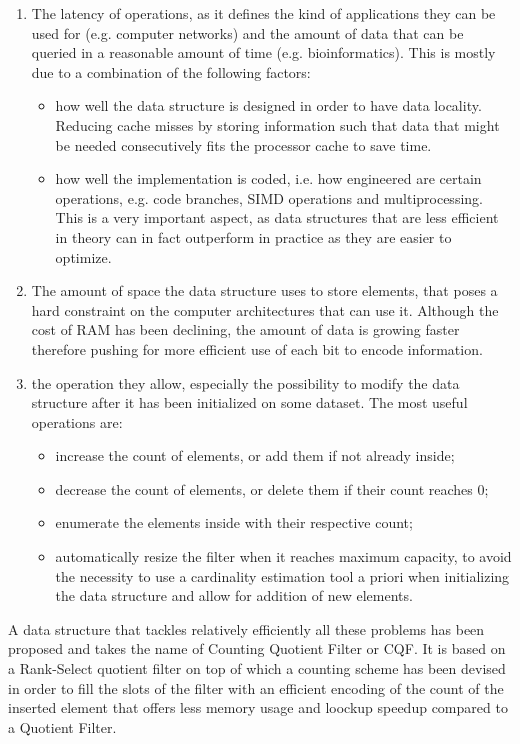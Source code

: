 \begin{enumerate}
	\item The latency of \memb operations, as it defines the kind of applications they can be used for (e.g. computer networks) and the amount of data that can be queried in a reasonable amount of time (e.g. bioinformatics). This is mostly due to a combination of the following factors:
	\begin{itemize}
		\item how well the data structure is designed in order to have data locality. Reducing cache misses by storing information such that data that might be needed consecutively fits the processor cache to save time.
		\item how well the implementation is coded, i.e. how engineered are certain operations, e.g. code branches, SIMD operations and multiprocessing. This is a very important aspect, as data structures that are less efficient in theory can in fact outperform in practice as they are easier to optimize.
	\end{itemize}
	\item The amount of space the data structure uses to store elements, that poses a hard constraint on the computer architectures that can use it. Although the cost of RAM has been declining, the amount of data is growing faster therefore pushing for more efficient use of each bit to encode information.
	\item the operation they allow, especially the possibility to modify the data structure after it has been initialized on some dataset. The most useful operations are:
	\begin{itemize}
		\item increase the count of elements, or add them if not already inside; 
		\item decrease the count of elements, or delete them if their count reaches 0;
		\item enumerate the elements inside with their respective count;
		\item automatically resize the filter when it reaches maximum capacity, to avoid the necessity to use a cardinality estimation tool a priori when initializing the data structure and allow for addition of new elements.
	\end{itemize}
\end{enumerate}
A data structure that tackles relatively efficiently all these problems has been proposed and takes the name of Counting Quotient Filter or CQF. It is based on a Rank-Select quotient filter on top of which a counting scheme has been devised in order to fill the slots of the filter with an efficient encoding of the count of the inserted element that offers less memory usage and loockup speedup compared to a Quotient Filter.

